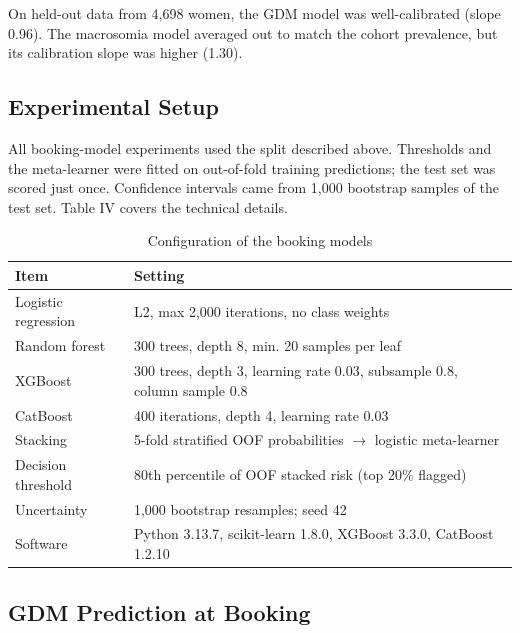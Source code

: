\documentclass[conference]{IEEEtran}
\begin{document}
On held-out data from 4,698 women, the GDM model was well-calibrated (slope 0.96). The macrosomia model averaged out to match the cohort prevalence, but its calibration slope was higher (1.30).



\subsection{Experimental Setup}

All booking-model experiments used the split described above. Thresholds and the meta-learner were fitted on out-of-fold training predictions; the test set was scored just once. Confidence intervals came from 1,000 bootstrap samples of the test set. Table IV covers the technical details.



\begin{table}[t]
\centering
\caption{Configuration of the booking models}\label{tab:4}
\footnotesize
\setlength{\tabcolsep}{2pt}
\begin{tabular}{p{0.95in}p{2.45in}}
\toprule
\textbf{Item} & \textbf{Setting} \\
\midrule
Logistic regression & L2, max 2,000 iterations, no class weights \\
Random forest & 300 trees, depth 8, min. 20 samples per leaf \\
XGBoost & 300 trees, depth 3, learning rate 0.03, subsample 0.8, column sample 0.8 \\
CatBoost & 400 iterations, depth 4, learning rate 0.03 \\
Stacking & 5-fold stratified OOF probabilities $\to$ logistic meta-learner \\
Decision threshold & 80th percentile of OOF stacked risk (top 20\% flagged) \\
Uncertainty & 1,000 bootstrap resamples; seed 42 \\
Software & Python 3.13.7, scikit-learn 1.8.0, XGBoost 3.3.0, CatBoost 1.2.10 \\
\bottomrule
\end{tabular}
\end{table}


\subsection{GDM Prediction at Booking}
\end{document}
